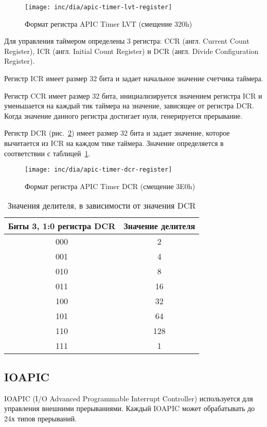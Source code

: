 \begin{figure}[ht!]
  \centering
  \texttt{[image: inc/dia/apic-timer-lvt-register]}
  \caption{Формат регистра APIC Timer LVT (смещение 320h)}
  \label{fig:apic-timer-lvt-register}
\end{figure}

Для управления таймером определены 3 регистра: CCR (англ. Current Count Register),
ICR (англ. Initial Count Register) и DCR (англ. Divide Configuration Register).

Регистр ICR имеет размер 32 бита и задает начальное значение счетчика таймера.

Регистр CCR имеет размер 32 бита, инициализируется значением регистра ICR и
уменьшается на каждый тик таймера на значение, зависящее от регистра DCR. Когда значение
данного регистра достигает нуля, генерируется прерывание.

Регистр DCR (рис.~\ref{fig:apic-timer-dcr-register}) имеет размер 32 бита и задает значение, которое вычитается из ICR
на каждом тике таймера. Значение определяется в соответствии с таблицей~\ref{tab:apic_timer_dcr_values}.
\begin{figure}[ht!]
  \centering
  \texttt{[image: inc/dia/apic-timer-dcr-register]}
  \caption{Формат регистра APIC Timer DCR (смещение 3E0h)}
  \label{fig:apic-timer-dcr-register}
\end{figure}

\begin{table}[ht!]
  \centering
  \caption{Значения делителя, в зависимости от значения DCR}
  \label{tab:apic_timer_dcr_values}
  \begin{tabular}{|c|c|}
    \hline
    Биты 3, 1:0 регистра DCR & Значение делителя \\
    \hline
    000 & 2 \\
    \hline
    001 & 4 \\
    \hline
    010 & 8 \\
    \hline
    011 & 16 \\
    \hline
    100 & 32 \\
    \hline
    101 & 64 \\
    \hline
    110 & 128 \\
    \hline
    111 & 1 \\
    \hline
  \end{tabular}
\end{table}

\subsection{IOAPIC}
IOAPIC (I/O Advanced Programmable Interrupt Controller) используется для
управления внешними прерываниями. Каждый IOAPIC может обрабатывать до 24х типов прерываний.

